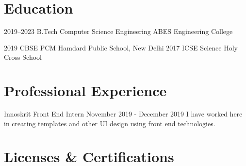 \documentclass[]{cv-style}          %
\begin{document}

\section{Education}

\begin{entrylist}
\entry
{2019--2023}
{B.Tech {\normalfont Computer Science Engineering }}
{ABES Engineering College}
{\vspace{-0.3cm}}

\entry
{2019}
{CBSE {\normalfont PCM }}
{Hamdard Public School, New Delhi}
{\vspace{-0.3cm}}
\entry
{2017}
{ICSE {\normalfont Science }}
{Holy Cross School}
{}
\end{entrylist}


\section{ Professional Experience}

\begin{entrylist}
\entry
{Innoskrit}
{Front End Intern }
{November 2019 - December 2019}
{I have worked here in creating templates and other UI design using front end technologies.}
{\vspace{-0.3cm}}
\end{entrylist}






\section{Licenses \& Certifications}
\end{document}
